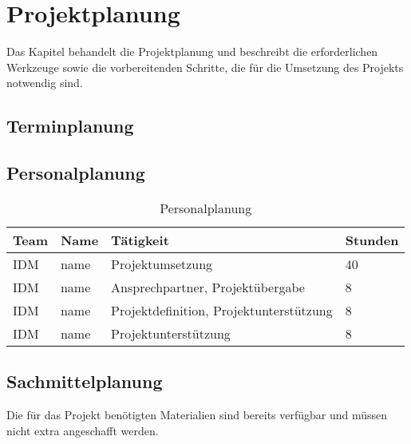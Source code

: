 \chapter{Projektplanung}
Das Kapitel behandelt die Projektplanung und beschreibt die erforderlichen Werkzeuge sowie die vorbereitenden Schritte, die für die Umsetzung des Projekts notwendig sind.

\section{Terminplanung}
\lipsum[2-4]

\section{Personalplanung}
\lipsum[2-4]

\begin{table}[h!]
\centering
\begin{tabular}{|l|l|l|l|}
\hline
\textbf{Team} & \textbf{Name} & \textbf{Tätigkeit} &  \textbf{Stunden}  \\ \hline
IDM        & name      & Projektumsetzung & 40       \\ \hline
IDM        & name    & Ansprechpartner, Projektübergabe & 8        \\ \hline
IDM        & name          & Projektdefinition, Projektunterstützung & 8        \\ \hline
IDM        & name                & Projektunterstützung                      & 8         \\ \hline
\end{tabular}
\caption{Personalplanung}
\label{tab:Personalplanung}
\end{table}

\section{Sachmittelplanung}
Die für das Projekt benötigten Materialien sind bereits verfügbar und müssen nicht extra angeschafft werden.

